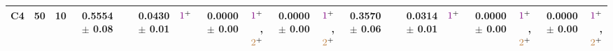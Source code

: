 \begin{table}
\begin{tiny}
\begin{tabular}[t]{rrrrrrrrrrrrrrrrrrr}
\multirow{-10}{*}{\raggedleft\arraybackslash C4} & 50 & 10 & 0.5554 $\pm$ 0.08 &  & 0.0430 $\pm$ 0.01 & $\textcolor{violet}{1}^{+}$ & \textbf{0.0000} $\pm$ 0.00 & $\textcolor{violet}{1}^{+}$,$\textcolor{brown}{2}^{+}$ & \textbf{0.0000} $\pm$ 0.00 & $\textcolor{violet}{1}^{+}$,$\textcolor{brown}{2}^{+}$ & 0.3570 $\pm$ 0.06 &  & 0.0314 $\pm$ 0.01 & $\textcolor{violet}{1}^{+}$ & \textbf{0.0000} $\pm$ 0.00 & $\textcolor{violet}{1}^{+}$,$\textcolor{brown}{2}^{+}$ & \textbf{0.0000} $\pm$ 0.00 & $\textcolor{violet}{1}^{+}$,$\textcolor{brown}{2}^{+}$\\
\bottomrule
\end{tabular}
\end{tiny}
\end{table}